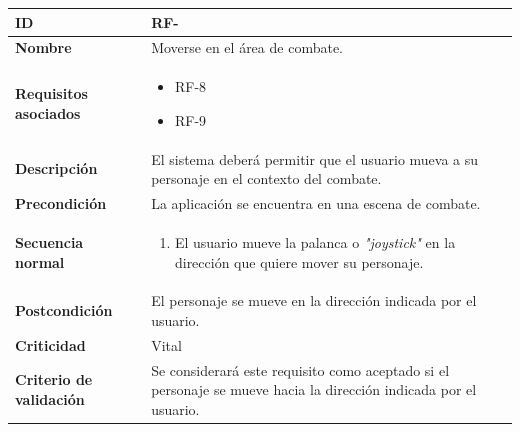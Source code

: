 \begin{center}
	\begin{tabular}{ | p{4.7cm} | p{10cm} | } 
		\hline
		
		\textbf{ID} & RF-\arabic{contador_requisitos_funcionales}
		{contador_requisitos_funcionales} \\
		
		\hline 
		\textbf{Nombre} &
		Moverse en el área de combate.\\ 
		
		\hline
		\textbf{Requisitos asociados} & 
		\begin{itemize}
			\item RF-8
			\item RF-9
		\end{itemize}\\
		
		\hline
		\textbf{Descripción} & 
		El sistema deberá permitir que el usuario mueva a su personaje en el contexto del combate.\\
		
		\hline
		\textbf{Precondición} & 
		La aplicación se encuentra en una escena de combate.\\
		
		\hline
		\textbf{Secuencia normal} &
		\begin{enumerate}
			\item El usuario mueve la palanca o \textit{"joystick"} en la dirección que quiere mover su personaje.
		\end{enumerate}
		\\
		
		\hline
		\textbf{Postcondición} & 
		El personaje se mueve en la dirección indicada por el usuario.\\
		
		\hline 
		\textbf{Criticidad} &
		Vital\\
		
		\hline 
		\textbf{Criterio de validación} & 
		Se considerará este requisito como aceptado si el personaje se mueve hacia la dirección indicada por el usuario.\\
		
		\hline
	\end{tabular}
\end{center}

